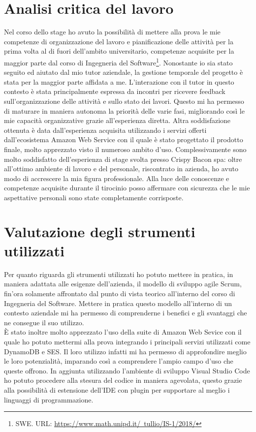\section{Analisi critica del lavoro}
Nel corso dello stage ho avuto la possibilità di mettere alla prova le mie competenze di organizzazione del lavoro e pianificazione delle attività per la prima volta al di fuori dell'ambito universitario, competenze acquisite per la maggior parte dal corso di Ingegneria del Software\footnote{SWE. URL: \href{https://www.math.unipd.it/~tullio/IS-1/2018/}{https://www.math.unipd.it/~tullio/IS-1/2018/}}. Nonostante io sia stato seguito ed aiutato dal mio tutor aziendale, la gestione temporale del progetto è stata per la maggior parte affidata a me. L'interazione con il tutor in questo contesto è stata principalmente espressa da incontri per ricevere feedback sull'organizzazione delle attività e sullo stato dei lavori. Questo mi ha permesso di maturare in maniera autonoma la priorità delle varie fasi, migliorando così le mie capacità organizzative grazie all'esperienza diretta. Altra soddisfazione ottenuta è data dall'esperienza acquisita utilizzando i servizi offerti dall'ecosistema Amazon Web Service con il quale è stato progettato il prodotto finale, molto apprezzato visto il numeroso ambito d'uso. Complessivamente sono molto soddisfatto dell'esperienza di stage svolta presso Crispy Bacon spa: oltre all'ottimo ambiente di lavoro e del personale, riscontrato in azienda, ho avuto modo di accrescere la mia figura professionale. Alla luce delle conoscenze e competenze acquisite durante il tirocinio posso affermare con sicurezza che le mie aspettative personali sono state completamente corrisposte.

\newpage
\section{Valutazione degli strumenti utilizzati}
Per quanto riguarda gli strumenti utilizzati ho potuto mettere in pratica, in maniera adattata alle esigenze dell'azienda, il modello di sviluppo agile Scrum, fin'ora solamente affrontato dal punto di vista teorico all'interno del corso di Ingegneria del Software. Mettere in pratica questo modello all'interno di un contesto aziendale mi ha permesso di comprenderne i benefici e gli svantaggi che ne consegue il suo utilizzo.\\
È stato inoltre molto apprezzato l'uso della suite di Amazon Web Sevice con il quale ho potuto mettermi alla prova integrando i principali servizi utilizzati come DynamoDB e SES. Il loro utilizzo infatti mi ha permesso di approfondire meglio le loro potenzialità, imparando così a comprendere l'ampio campo d'uso che queste offrono. In aggiunta utilizzando l'ambiente di sviluppo Visual Studio Code ho potuto procedere alla stesura del codice in maniera agevolata, questo grazie alla possibilità di estensione dell'IDE con plugin per supportare al meglio i linguaggi di programmazione.\\[0.6cm]

